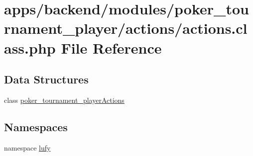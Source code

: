 \hypertarget{backend_2modules_2poker__tournament__player_2actions_2actions_8class_8php}{\section{apps/backend/modules/poker\-\_\-tournament\-\_\-player/actions/actions.class.\-php File Reference}
\label{backend_2modules_2poker__tournament__player_2actions_2actions_8class_8php}
}
\subsection*{Data Structures}
\begin{DoxyCompactItemize}
\item 
class \hyperlink{classpoker__tournament__player_actions}{poker\-\_\-tournament\-\_\-player\-Actions}
\end{DoxyCompactItemize}
\subsection*{Namespaces}
\begin{DoxyCompactItemize}
\item 
namespace \hyperlink{namespacelufy}{lufy}
\end{DoxyCompactItemize}
